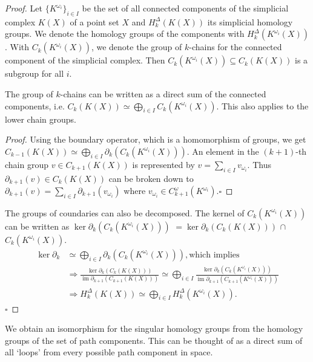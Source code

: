 \documentclass[envcountsect,runningheads]{llncs}
\DeclareMathOperator{\Ima}{im}
\renewcommand{\qed}{\hfill$\square$}
\begin{document}
\begin{proof}
Let $\{K^{\omega_{i}}\}_{i \in I}$ be the set of all connected components of the simplicial complex $K(X)$ of a point set $X$ and $H^{\Delta}_k\left(K\left(X\right)\right)$ its simplicial homology groups. We denote the homology groups of the components with $H_k^{\Delta}(K^{\omega_{i}}(X))$. With $C_k(K^{\omega_{i}}(X))$, we denote the group of $k$-chains for the connected component of the simplicial complex. Then $C_k(K^{\omega_{i}}(X)) \subseteq C_k(K(X))$ is a subgroup for all $i$.

\begin{lemma}
The group of $k$-chains can be written as a direct sum of the connected components, i.e. $C_k(K(X)) \simeq \bigoplus_{i \in I} C_k(K^{\omega_{i}}(X))$. This also applies to the lower chain groups.
\end{lemma}

\begin{proof}
Using the boundary operator, which is a homomorphism of groups, we get $C_{k-1}(K(X)) \simeq \bigoplus_{i \in I} \partial_k(C_{k}(K^{\omega_{i}}(X)))$. An element in the $(k+1)$-th chain group $v \in C_{k+1}(K(X))$ is represented by $v = \sum_{i \in I} v_{\omega_{i}}$. Thus $\partial_{k+1}(v) \in C_{k}(K(X))$ can be broken down to $\partial_{k+1}(v) = \sum_{i \in I} \partial_{k+1}(v_{\omega_{i}})$ where $v_{\omega_{i}} \in C^\omega_{k+1}(K^{\omega_{i}})$.\qed
\end{proof}

The groups of coundaries can also be decomposed. The kernel of $C_k(K^{\omega_{i}}(X))$ can be written as $\ker \partial_k(C_k(K^{\omega_{i}}(X)))$ $= \ker \partial_k(C_k(K(X)))$ $\cap$ $C_k(K^{\omega_{i}}(X))$.
\begin{align}
	\ker \partial_k &\simeq \bigoplus_{i \in I} \partial_k\left(C_k\left(K^{\omega_{i}}(X)\right)\right), \text{which implies}\\
	&\Rightarrow \frac{\ker \partial_k\left(C_k\left(K\left(X\right)\right)\right)}{\Ima \partial_{k+1}\left(C_{k+1}\left(K\left(X\right)\right)\right)} \simeq \bigoplus_{i \in I} \frac{\ker \partial_k(C_k(K^{\omega_{i}}(X)))}{\Ima \partial_{k+1}(C_{k+1}(K^{\omega_{i}}(X)))}\\
	&\Rightarrow H^{\Delta}_k(K(X)) \simeq \bigoplus_{i \in I} H^{\Delta}_k(K^{\omega_{i}}(X)).
\end{align}
\qed
\end{proof}

\begin{remarklem}
We obtain an isomorphism for the singular homology groups from the homology groups of the set of path components. This can be thought of as a direct sum of all `loops' from every possible path component in space.
\end{remarklem}
\end{document}
